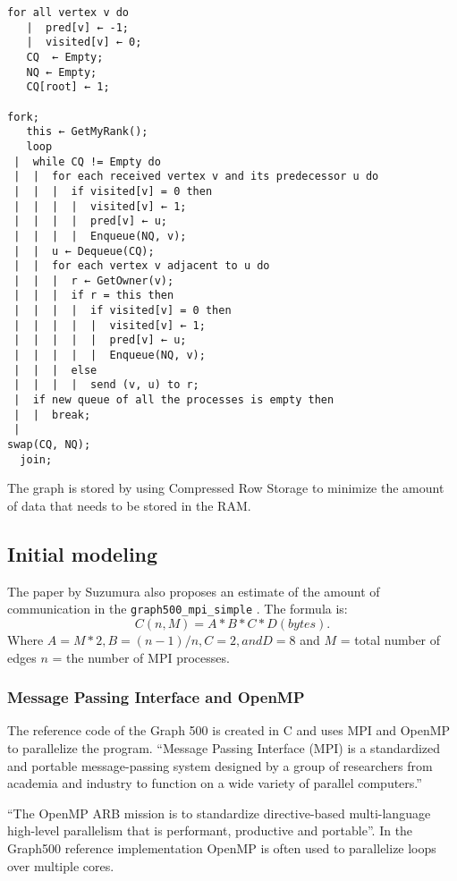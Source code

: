 \begin{lstlisting}[label={code:pseudo-simple},caption={Pseudo code taken from paper \cite{suzumura2011performance}}]
for all vertex v do 
   |  pred[v] ← -1; 
   |  visited[v] ← 0; 
   CQ  ← Empty; 
   NQ ← Empty; 
   CQ[root] ← 1; 
   
fork;
   this ← GetMyRank(); 
   loop 
 |  while CQ != Empty do 
 |  |  for each received vertex v and its predecessor u do 
 |  |  |  if visited[v] = 0 then 
 |  |  |  |  visited[v] ← 1; 
 |  |  |  |  pred[v] ← u; 
 |  |  |  |  Enqueue(NQ, v); 
 |  |  u ← Dequeue(CQ); 
 |  |  for each vertex v adjacent to u do 
 |  |  |  r ← GetOwner(v); 
 |  |  |  if r = this then 
 |  |  |  |  if visited[v] = 0 then 
 |  |  |  |  |  visited[v] ← 1; 
 |  |  |  |  |  pred[v] ← u; 
 |  |  |  |  |  Enqueue(NQ, v); 
 |  |  |  else 
 |  |  |  |  send (v, u) to r; 
 |  if new queue of all the processes is empty then 
 |  |  break; 
 |  
swap(CQ, NQ); 
  join;
\end{lstlisting}

The graph is stored by using Compressed Row Storage\cite{crs} to minimize the amount of data that needs to be stored in the RAM. 



\subsection*{Initial modeling}
The paper by Suzumura \cite{suzumura2011performance} also proposes an estimate of the amount of communication in the \texttt{graph500\_mpi\_simple} . The formula is:
\begin{equation}
\label{eq:communication_size}
C(n, M) = A * B * C * D (bytes).
\end{equation}
Where $A = M*2, B = (n-1)/n, C=2, and D=8$ and $M$ = total number of edges $n$ = the number of MPI processes. 

\subsubsection{Message Passing Interface and OpenMP}
\label{mpiopenmp}
The reference code of the Graph 500 is created in C and uses MPI and OpenMP to parallelize the program.
``Message Passing Interface (MPI) is a standardized and portable message-passing system designed by a group of researchers from academia and industry to function on a wide variety of parallel computers.\cite{mpi}''


``The OpenMP ARB mission is to standardize directive-based multi-language high-level parallelism that is performant, productive and portable''\cite{openmp}. In the Graph500 reference implementation OpenMP is often used to parallelize loops over multiple cores. 


